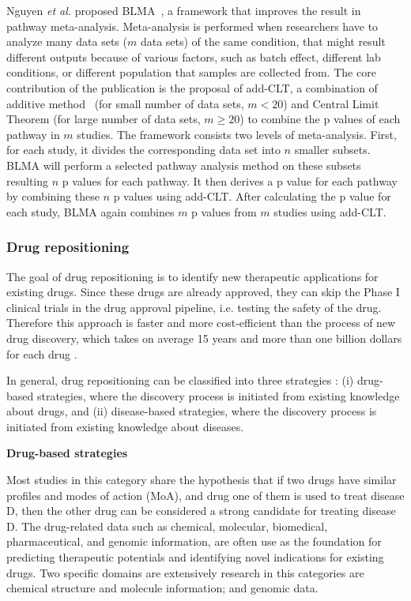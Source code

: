 \documentclass[Minh_PhD_thesis.tex]{subfiles}
\begin{document}
Nguyen \textit{et al.} proposed BLMA~\cite{nguyen2017blma,nguyen2015novel}, a framework that improves the result in pathway meta-analysis. Meta-analysis is performed when researchers have to analyze many data sets ($m$ data sets) of the same condition, that might result different outputs because of various factors, such as batch effect, different lab conditions, or different population that samples are collected from.
The core contribution of the publication is the proposal of add-CLT, a combination of additive method~\cite{edgington1972additive} (for small number of data sets, $m < 20$) and Central Limit Theorem (for large number of data sets, $m \geq 20$) to combine the p values of each pathway in $m$ studies.
The framework consists two levels of meta-analysis. First, for each study, it divides the corresponding data set into $n$ smaller subsets. BLMA will perform a selected pathway analysis method on these subsets resulting $n$ p values for each pathway. It then derives a p value for each pathway by combining these $n$ p values using add-CLT. After calculating the p value for each study, BLMA again combines $m$ p values from $m$ studies using add-CLT.




\subsubsection{Drug repositioning}

The goal of drug repositioning is to identify new therapeutic applications for existing drugs. Since these drugs are already approved, they can skip the Phase I clinical trials in the drug approval pipeline, i.e. testing the safety of the drug. Therefore this approach is faster and more cost-efficient than the process of new drug discovery, which takes on average 15 years and more than one billion dollars for each drug \cite{chong2007new}. 

In general, drug repositioning can be classified into three strategies \cite{jarada2020review}: (i) drug-based strategies, where the discovery process is initiated from existing knowledge about drugs, and (ii) disease-based strategies, where the discovery process is initiated from existing knowledge about diseases. %

\textbf{Drug-based strategies}

Most studies in this category share the hypothesis that if two drugs have similar profiles and modes of action (MoA), and drug one of them is used to treat disease D, then the other drug can be considered a strong candidate for treating disease D. The drug-related data such as chemical, molecular, biomedical, pharmaceutical, and genomic information, are often use as the foundation for predicting therapeutic potentials and identifying novel indications for existing drugs. Two specific domains are extensively research in this categories are chemical structure and molecule information; and genomic data.
\end{document}
